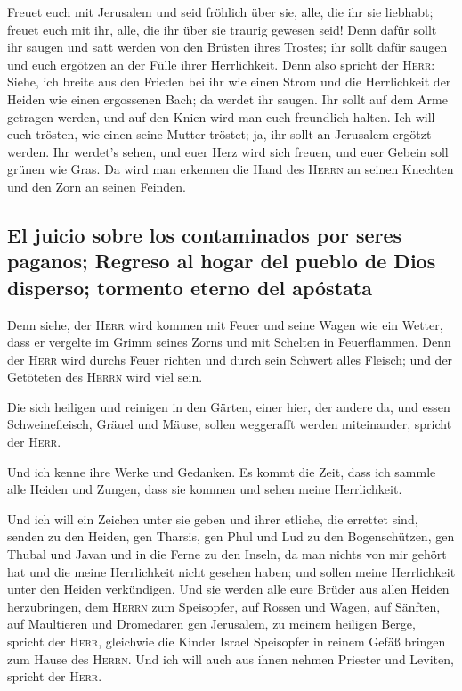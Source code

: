  Freuet euch mit Jerusalem und seid fröhlich über sie,
alle, die ihr sie liebhabt; freuet euch mit ihr, alle, die ihr über sie
traurig gewesen seid!  Denn dafür sollt ihr saugen und
satt werden von den Brüsten ihres Trostes; ihr sollt dafür saugen und
euch ergötzen an der Fülle ihrer Herrlichkeit.  Denn also
spricht der \textsc{Herr}: Siehe, ich breite aus den Frieden bei ihr wie
einen Strom und die Herrlichkeit der Heiden wie einen ergossenen Bach;
da werdet ihr saugen. Ihr sollt auf dem Arme getragen werden, und auf
den Knien wird man euch freundlich halten.  Ich will euch
trösten, wie einen seine Mutter tröstet; ja, ihr sollt an Jerusalem
ergötzt werden.  Ihr werdet's sehen, und euer Herz wird
sich freuen, und euer Gebein soll grünen wie Gras. Da wird man erkennen
die Hand des \textsc{Herrn} an seinen Knechten und den Zorn an seinen
Feinden.

\hypertarget{el-juicio-sobre-los-contaminados-por-seres-paganos-regreso-al-hogar-del-pueblo-de-dios-disperso-tormento-eterno-del-apuxf3stata}{%
\subsection{El juicio sobre los contaminados por seres paganos; Regreso
al hogar del pueblo de Dios disperso; tormento eterno del
apóstata}\label{el-juicio-sobre-los-contaminados-por-seres-paganos-regreso-al-hogar-del-pueblo-de-dios-disperso-tormento-eterno-del-apuxf3stata}}

 Denn siehe, der \textsc{Herr} wird kommen mit Feuer und
seine Wagen wie ein Wetter, dass er vergelte im Grimm seines Zorns und
mit Schelten in Feuerflammen.  Denn der \textsc{Herr}
wird durchs Feuer richten und durch sein Schwert alles Fleisch; und der
Getöteten des \textsc{Herrn} wird viel sein.

 Die sich heiligen und reinigen in den Gärten, einer
hier, der andere da, und essen Schweinefleisch, Gräuel und Mäuse, sollen
weggerafft werden miteinander, spricht der \textsc{Herr}.

 Und ich kenne ihre Werke und Gedanken. Es kommt die
Zeit, dass ich sammle alle Heiden und Zungen, dass sie kommen und sehen
meine Herrlichkeit.

 Und ich will ein Zeichen unter sie geben und ihrer
etliche, die errettet sind, senden zu den Heiden, gen Tharsis, gen Phul
und Lud zu den Bogenschützen, gen Thubal und Javan und in die Ferne zu
den Inseln, da man nichts von mir gehört hat und die meine Herrlichkeit
nicht gesehen haben; und sollen meine Herrlichkeit unter den Heiden
verkündigen.  Und sie werden alle eure Brüder aus allen
Heiden herzubringen, dem \textsc{Herrn} zum Speisopfer, auf Rossen und
Wagen, auf Sänften, auf Maultieren und Dromedaren gen Jerusalem, zu
meinem heiligen Berge, spricht der \textsc{Herr}, gleichwie die Kinder
Israel Speisopfer in reinem Gefäß bringen zum Hause des \textsc{Herrn}.
 Und ich will auch aus ihnen nehmen Priester und Leviten,
spricht der \textsc{Herr}.

